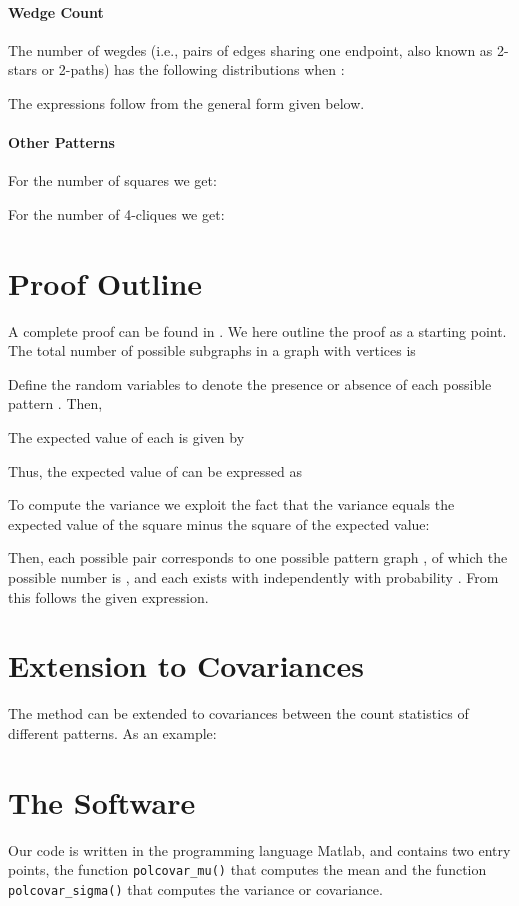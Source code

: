 \documentclass{article}
\begin{document}
\paragraph{Wedge Count}
The number  of wegdes (i.e., pairs of edges sharing one endpoint,
also known as 2-stars or 2-paths) has
the following distributions when :



The expressions follow from the general form given below. 

\paragraph{Other Patterns}
For the number  of squares we get:

For the number  of 4-cliques we get: 


\section{Proof Outline}
A complete proof can be found in \cite{gp6}.  We here outline the proof
as a starting point. The total number of possible subgraphs  in a graph
with  vertices is 

Define the random variables  to denote the
presence or absence of each possible pattern .  
Then, 

The expected value of each  is given by

Thus, the expected value of  can be expressed as

To compute the variance we exploit the fact that the variance equals the
expected value of the square minus the square of the expected value: 

Then, each possible pair corresponds to one possible pattern graph ,
of which the possible number is
, and each exists
with independently with probability .  From this follows
the given expression. 

\section{Extension to Covariances}
The method can be extended to covariances between the count statistics
of different patterns.  As an example:


\section{The Software}
Our code is written in the programming language Matlab, and contains two
entry points, the function \texttt{polcovar\_mu()} that computes the
mean and the function \texttt{polcovar\_sigma()} that computes the
variance or covariance. 
\end{document}

